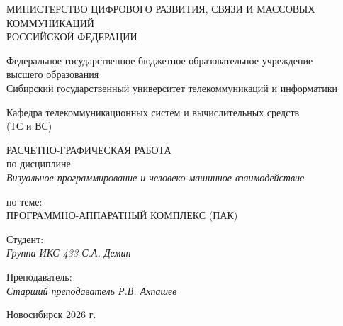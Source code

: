 \thispagestyle{empty}

\begin{center}
    МИНИСТЕРСТВО ЦИФРОВОГО РАЗВИТИЯ, СВЯЗИ И МАССОВЫХ КОММУНИКАЦИЙ \\ РОССИЙСКОЙ ФЕДЕРАЦИИ

    \vspace{20pt}

    Федеральное государственное бюджетное образовательное учреждение  \\  высшего образования \\
    Сибирский государственный университет телекоммуникаций и информатики \\

    \vspace{20pt}

    Кафедра телекоммуникационных систем и вычислительных средств \\  (ТС и ВС)
\end{center}

\vfill

\begin{center}
    РАСЧЕТНО-ГРАФИЧЕСКАЯ РАБОТА \\  
    по дисциплине \\
    \textit{Визуальное программирование и человеко-машинное взаимодействие}

    \vspace{20pt}

    по теме: \\
    \uppercase{Программно-аппаратный комплекс (ПАК)}
\end{center}

\vfill

    \noindent Студент: \\
    \textit{Группа ИКС-433 \hfill С.А. Демин}

    \vspace{20pt}

    \noindent Преподаватель: \\
    \textit{Старший преподаватель \hfill Р.В. Ахпашев}

\vfill

\begin{center}
    Новосибирск 2026 г.
\end{center}
